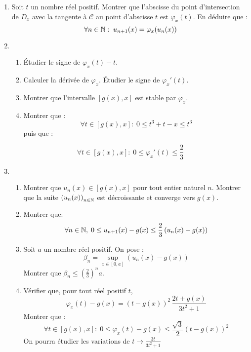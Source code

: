 \begin{enumerate}
 \item Soit $t$ un nombre réel positif. Montrer que l'abscisse du point d'intersection de $D_x$ avec la tangente à $\mathcal C$ au point d'abscisse $t$ est $\varphi_x(t)$. En déduire que :
\begin{displaymath}
 \forall n\in \mathbb{N}:\;u_{n+1}(x) = \varphi_x(u_n(x))
\end{displaymath}
 \item 
\begin{enumerate}
 \item \'Etudier le signe de $\varphi_x(t) -t$.
 \item Calculer la dérivée de $\varphi_x$. \'Etudier le signe de $\varphi_x'(t)$.
 \item Montrer que l'intervalle $[g(x),x]$ est stable par $\varphi_x$.
 \item Montrer que :
\begin{displaymath}
 \forall t\in [g(x),x]:\; 0\leq t^3 + t -x \leq t^3
\end{displaymath}
puis que :
\end{enumerate}
\begin{displaymath}
 \forall t\in [g(x),x]:\; 0\leq \varphi_x'(t) \leq \frac{2}{3}
\end{displaymath}

\item 
\begin{enumerate}
 \item Montrer que $u_n(x)\in [g(x),x]$ pour tout entier naturel $n$. Montrer que la suite $\left( u_n(x)\right) _{n\in \mathbb{N}}$ est décroissante et converge vers $g(x)$.
 \item Montrer que:
\begin{displaymath}
\forall n\in \mathbb{N},\; 0\leq u_{n+1}(x)-g(x) \leq \frac{2}{3}\left( u_n(x) -g(x)\right) 
\end{displaymath}
\item Soit $a$ un nombre réel positif. On pose :
\begin{displaymath}
  \beta_n = \sup_{x\in [0,a]}\left(u_n(x)-g(x) \right) 
\end{displaymath}
Montrer que $\beta_n \leq (\frac{2}{3})^na$.

\item Vérifier que, pour tout réel positif $t$,
\begin{displaymath}
 \varphi_x(t) - g(x) = (t-g(x))^2\,\frac{2t+g(x)}{3t^2+1}
\end{displaymath}
Montrer que :
\begin{displaymath}
 \forall t\in[g(x),x]:\; 0\leq \varphi_x(t) -g(x) \leq \frac{\sqrt{3}}{2}(t-g(x))^2
\end{displaymath}
On pourra étudier les variations de $t\rightarrow \frac{3t}{3t^2+1}$
\end{enumerate}

\end{enumerate}

